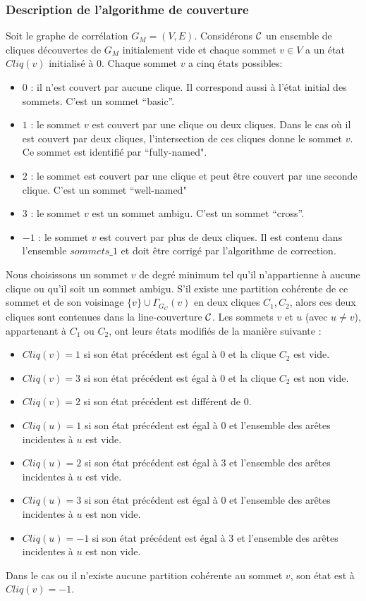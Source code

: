 \subsubsection{Description de l'algorithme de couverture}
Soit le graphe de corr\'elation $G_M = (V,E)$.
Consid\'erons $\cal C$ un ensemble de cliques d\'ecouvertes de $G_M$ initialement vide et chaque sommet $v \in V$ a un \'etat  $Cliq(v)$ initialis\'e \`a $0$.
\newline
Chaque sommet $v$ a cinq \'etats possibles:
\begin{itemize}
	\item $0$ : il n'est couvert par aucune clique. Il correspond aussi \`a l'\'etat initial des sommets. C'est un sommet ``basic''.
	\item $1$ : le sommet $v$ est couvert par une clique ou deux cliques. Dans le cas o\`u il est couvert par deux cliques, l'intersection de ces cliques donne le sommet $v$. Ce sommet est identifi\'e par ``fully-named".
	\item $2$ : le sommet est couvert par une clique et peut \^etre couvert par une seconde clique. C'est un sommet ``well-named"
	\item $3$ : le sommet $v$ est un sommet ambigu. C'est un sommet ``cross''.
	\item $-1$ :  le sommet $v$ est couvert par plus de deux cliques. Il est contenu dans l'ensemble $sommets\_1$ et doit \^etre corrig\'e par l'algorithme de correction.
\end{itemize}
Nous choisissons un sommet $v$ de degr\'e minimum tel qu'il n'appartienne \`a aucune clique ou qu'il soit un sommet ambigu. 
S'il existe une partition coh\'erente de ce sommet et de son voisinage $\{v\} \cup \Gamma_{G_C}(v)$ en deux cliques $C_1, C_2$, alors ces deux cliques sont contenues dans la line-couverture $\cal C$. Les sommets $v$ et $u$ (avec $u \neq v$), appartenant \`a $C_1$ ou $C_2$, ont leurs \'etats modifi\'es de la mani\`ere suivante :
\begin{itemize}
\item $Cliq(v) = 1$ si son \'etat pr\'ec\'edent est \'egal \`a $0$ et la clique $C_2$ est vide. 
\item $Cliq(v) = 3$ si son \'etat pr\'ec\'edent est \'egal \`a $0$ et la clique $C_2$ est non vide. 
\item $Cliq(v) = 2$ si son \'etat pr\'ec\'edent est diff\'erent de $0$.
\item $Cliq(u) = 1$ si son \'etat pr\'ec\'edent est \'egal \`a $0$ et l'ensemble des ar\^etes incidentes \`a $u$ est vide.
\item $Cliq(u) = 2$ si son \'etat pr\'ec\'edent est \'egal \`a $3$ et l'ensemble des ar\^etes incidentes \`a $u$ est vide.
\item $Cliq(u) = 3$ si son \'etat pr\'ec\'edent est \'egal \`a $0$ et l'ensemble des ar\^etes incidentes \`a $u$ est non vide.
\item $Cliq(u) = -1$ si son \'etat pr\'ec\'edent est \'egal \`a $3$ et l'ensemble des ar\^etes incidentes \`a $u$ est non vide.
\end{itemize} 
Dans le cas ou il n'existe aucune partition coh\'erente au sommet $v$, son \'etat est \`a $Cliq(v)=-1$.

